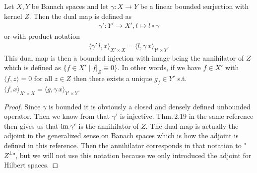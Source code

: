 \documentclass[../master_thesis.tex]{subfiles}
\begin{document}
\begin{lemma}\label{lem:dual_map_of_surjective_operator}
    Let $X, Y$ be Banach spaces and let $\gamma: X \rightarrow Y$ be a 
    linear bounded surjection with kernel $Z$. Then the dual map is defined as
    \begin{align*}
        \gamma': Y' \rightarrow X', l \mapsto l \circ \gamma
    \end{align*}
    or with product notation
    \begin{align*}
        \langle \gamma' \, l, x \rangle_{X' \times X} = \langle l, \gamma\,x \rangle_{Y'\times Y}.
    \end{align*}
    This dual map is then a bounded injection with image 
    being the annihilator of $Z$ which is defined as 
    $\{ f \in X' \mid f|_Z \equiv 0 \}$. In other words, if we have $f \in X'$
    with $\langle f, z \rangle = 0$ for all $z \in Z$ then there exists a unique 
    $g_f \in Y'$ s.t. $\langle f, x \rangle_{X' \times X} = \langle g, \gamma \, x \rangle_{Y'\times Y}$.
\end{lemma}
\begin{proof}
    Since $\gamma$ is bounded it is obviously a closed and densely defined 
    unbounded operator. Then we know from \cite[Thm.\,2.20]{brezis} that 
    $\gamma'$ is injective. Thm.\,2.19 in the same reference 
    then gives us that $\operatorname{im} \gamma'$ is the annihilator of $Z$. 
    The dual map is actually the adjoint in the generalized sense on Banach spaces 
    which is how the adjoint is defined in this reference. Then the 
    annihilator corresponds in that notation to "$Z^\perp$", but we will not use 
    this notation because we only introduced the adjoint for Hilbert spaces.
\end{proof}
\end{document}
